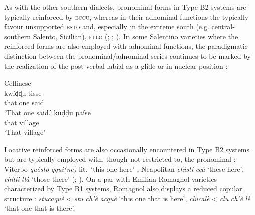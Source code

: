 \documentclass[output=paper]{langsci/langscibook}
\begin{document}
As with the other southern  dialects, pronominal forms in Type B2
systems are typically reinforced by \textsc{eccu}, whereas in their adnominal
functions the  typically favour unsupported \textsc{esto} and,
especially in the extreme south (e.g. central-southern Salento, Sicilian),
\textsc{ello} (\citealt[74]{Parascandola:1976a}; \citealt[156,
158f]{Mancarella:1998a}; \citealt[69]{Abbate:1995a}). In some Salentino
varieties where the reinforced forms are also employed with adnominal
functions, the paradigmatic distinction between the pronominal/adnominal series
continues to be marked by the realization of the post-verbal labial as a glide
or in nuclear position \citep[158]{Mancarella:1998a}:

\ea Cellinese \citep{Mancarella:1998a}\\
    \ea \gll kwíɖɖu  tisse\\
             that.one  said\\
        \glt \enquote*{That one said.}
    \ex
    \gll kuḍḍu  paíse\\
         that  village\\
    \glt \enquote*{That village}
    \z
\z

Locative reinforced forms are also occasionally encountered in Type B2
systems but are typically employed with, though not restricted to, the
pronominal : Viterbo \emph{quésto} \emph{qqui(ne)} lit.\ ‘this
one here’ \citep[484f]{Petroselli:2009a}, Neapolitan \emph{chisti} \emph{ccà}
‘these here’, \emph{chilli} \emph{llà} ‘those there’
(\citealt[168]{Iandolo:1994a}; \citealt[208, 212]{Iandolo:2001a}). On a par
with Emilian-Romagnol varieties characterized by Type B1 systems,
Romagnol also displays a reduced copular structure \citep[65]{Masotti:1999a}:
\emph{stucaquè} < \emph{stu} \emph{ch’è} \emph{acquè} ‘this one that is here’,
\emph{clucalè} < \emph{clu} \emph{ch’è} \emph{lè} ‘that one that is there’.
\end{document}
